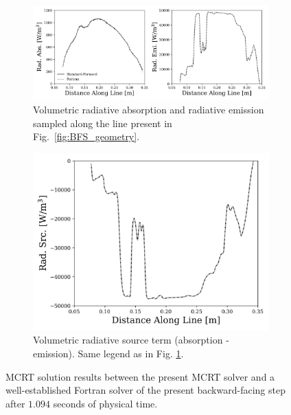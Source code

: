 \begin{figure}
  \begin{subfigure}{1\textwidth}
  \centering
  \includegraphics[width=1.0\linewidth]{figures/ch4/BFS_results_top.png}
  \caption{Volumetric radiative absorption and radiative emission sampled along the line present in Fig.~\ref{fig:BFS_geometry}.}
  \label{fig:BFS_RadAbsEmi}
  \end{subfigure}
  \begin{subfigure}{1\textwidth}
  \centering
  \includegraphics[width=0.55\linewidth]{figures/ch4/BFS_results_bottom.png}
  \caption{Volumetric radiative source term (absorption - emission). Same legend as in Fig. \ref{fig:BFS_RadAbsEmi}.}
  \label{fig:BFS_RadSrc}
  \end{subfigure}
  \caption{MCRT solution results between the present MCRT solver and a well-established Fortran solver of the present backward-facing step after $1.094$ seconds of physical time.}
  \label{fig:BFS_contours}
\end{figure}



